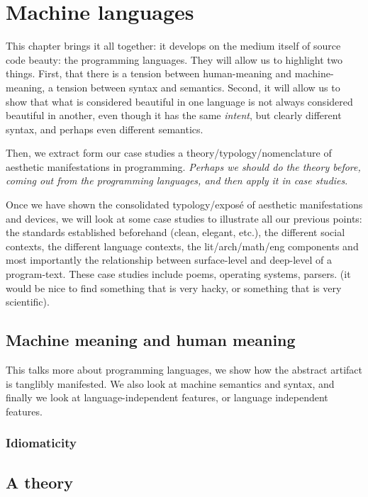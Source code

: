 \chapter{Machine languages}

This chapter brings it all together: it develops on the medium itself of source code beauty: the programming languages. They will allow us to highlight two things. First, that there is a tension between human-meaning and machine-meaning, a tension between syntax and semantics. Second, it will allow us to show that what is considered beautiful in one language is not always considered beautiful in another, even though it has the same \emph{intent}, but clearly different syntax, and perhaps even different semantics.

Then, we extract form our case studies a theory/typology/nomenclature of aesthetic manifestations in programming. \emph{Perhaps we should do the theory before, coming out from the programming languages, and then apply it in case studies}.

Once we have shown the consolidated typology/exposé of aesthetic manifestations and devices, we will look at some case studies to illustrate all our previous points: the standards established beforehand (clean, elegant, etc.), the different social contexts, the different language contexts, the lit/arch/math/eng components and most importantly the relationship between surface-level and deep-level of a program-text. These case studies include poems, operating systems, parsers. (it would be nice to find something that is very hacky, or something that is very scientific).

\section{Machine meaning and human meaning}

This talks more about programming languages, we show how the abstract artifact is tanglibly manifested. We also look at machine semantics and syntax, and finally we look at language-independent features, or language independent features.

\subsection{Idiomaticity}
\label{subsec:idiomaticity}

\section{A theory}


